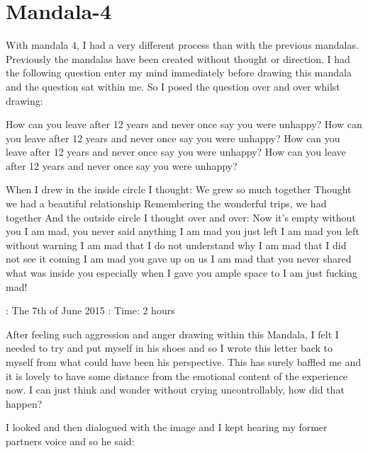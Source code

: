 \chapter{Mandala-4}




With mandala 4, I had a very different process than with the previous mandalas. Previously the mandalas have been created without thought or direction. I had the following question enter my mind immediately before drawing this mandala and the question sat within me. So I posed the question over and over whilst drawing:

How can you leave after 12 years and never once say you were unhappy? 
How can you leave after 12 years and never once say you were unhappy?
How can you leave after 12 years and never once say you were unhappy?
How can you leave after 12 years and never once say you were unhappy?

When I drew in the inside circle I thought:
We grew so much together 
Thought we had a beautiful relationship 
Remembering the wonderful trips, we had together 
And the outside circle I thought over and over:
Now it's empty without you
I am mad, you never said anything
I am mad you just left
I am mad you left without warning 
I am mad that I do not understand why
I am mad that I did not see it coming
I am mad you gave up on us
I am mad that you never shared what was inside you 
especially when I gave you ample space to 
I am just fucking mad!

\Date: The 7th of June 2015
\Total: Time: 2 hours

After feeling such aggression and anger drawing within this Mandala, I felt I needed to try and put myself in his shoes and so I wrote this letter back to myself from what could have been his perspective. This has surely baffled me and it is lovely to have some distance from the emotional content of the experience now. I can just think and wonder without crying uncontrollably, how did that happen? 

I looked and then dialogued with the image and I kept hearing my former partners voice and so he said:

